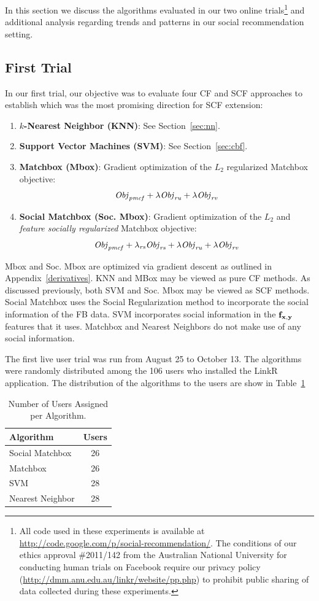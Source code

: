 In this section we discuss the algorithms evaluated in our two online
trials\footnote{All code used in these experiments is available at
\url{http://code.google.com/p/social-recommendation/}.  The conditions
of our ethics approval \#2011/142 from the Australian National
University for conducting human trials on Facebook require our
privacy policy
(\url{http://dmm.anu.edu.au/linkr/website/pp.php}) to
prohibit public sharing of data collected during these experiments.}
and additional analysis regarding trends and patterns in our social
recommendation setting.

\subsection{First Trial}

In our first trial, our objective was to evaluate four CF and SCF
approaches to establish which was the most promising direction for
SCF extension:
\begin{enumerate}
\item {\bf $k$-Nearest Neighbor (KNN)}: See Section~\ref{sec:nn}.
\item {\bf Support Vector Machines (SVM)}: See Section~\ref{sec:cbf}.
\item {\bf Matchbox (Mbox)}: Gradient optimization of the $L_2$ regularized
Matchbox objective:
$$\mathit{Obj}_{\mathit{pmcf}} + \lambda \mathit{Obj}_{\mathit{ru}} + \lambda \mathit{Obj}_{\mathit{rv}}$$
\item {\bf Social Matchbox (Soc. Mbox)}: Gradient optimization of the 
$L_2$ and \emph{feature socially regularized} Matchbox objective:
$$\mathit{Obj}_{\mathit{pmcf}} + \lambda_{\mathit{rs}} \mathit{Obj}_{\mathit{rs}} + \lambda \mathit{Obj}_{\mathit{ru}} + \lambda \mathit{Obj}_{\mathit{rv}}$$
\end{enumerate}
Mbox and Soc. Mbox are optimized via gradient descent as outlined
in Appendix~\ref{derivatives}.  
KNN and MBox may be viewed as pure CF methods.  As discussed previously,
both SVM and Soc. Mbox may be viewed as SCF methods.  
Social Matchbox uses the Social Regularization method to incorporate
the social information of the FB data. SVM incorporates social
information in the $\mathbf{f}_{\mathbf{x},\mathbf{y}}$ features that it uses. Matchbox and
Nearest Neighbors do not make use of any social information.

The first live user trial was run from August 25 to October 13. The algorithms were randomly distributed among the 106 users who installed the LinkR application. The distribution of the algorithms to the users are show in Table~\ref{tab:Assigned1}

\begin{table}[t!]
\centering
\begin{tabular}{| l | c |}
\hline
{\bf Algorithm} & {\bf Users} \\
\hline
Social Matchbox & 26\\
Matchbox  & 26 \\
SVM & 28 \\
Nearest Neighbor & 28 \\
\hline
\end{tabular}
\caption{Number of Users Assigned per Algorithm.}
\label{tab:Assigned1}
\end{table}

